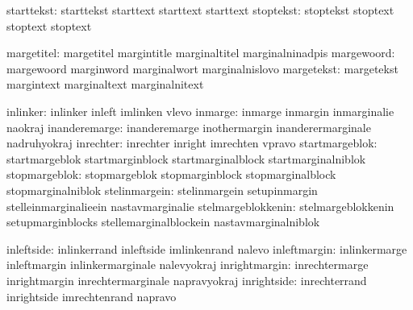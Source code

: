                   starttekst:  starttekst                   starttext
                                starttext                    starttext
                    stoptekst:  stoptekst                    stoptext
                                stoptext                     stoptext

                   margetitel:  margetitel                   margintitle
                                marginaltitel                marginalninadpis
                   margewoord:  margewoord                   marginword
                                marginalwort                 marginalnislovo
                   margetekst:  margetekst                   margintext
                                marginaltext                 marginalnitext

                     inlinker:  inlinker                     inleft
                                imlinken                     vlevo
                      inmarge:  inmarge                      inmargin
                                inmarginalie                 naokraj
                inanderemarge:  inanderemarge                inothermargin
                                inanderermarginale           nadruhyokraj
                    inrechter:  inrechter                    inright
                                imrechten                    vpravo
               startmargeblok:  startmargeblok               startmarginblock
                                startmarginalblock           startmarginalniblok
                stopmargeblok:  stopmargeblok                stopmarginblock
                                stopmarginalblock            stopmarginalniblok
                stelinmargein:  stelinmargein                setupinmargin
                                stelleinmarginalieein        nastavmarginalie
           stelmargeblokkenin:  stelmargeblokkenin           setupmarginblocks
                                stellemarginalblockein       nastavmarginalniblok

                   inleftside:  inlinkerrand                 inleftside
                                imlinkenrand                 nalevo
                 inleftmargin:  inlinkermarge                inleftmargin
                                inlinkermarginale            nalevyokraj
                inrightmargin:  inrechtermarge               inrightmargin
                                inrechtermarginale           napravyokraj
                  inrightside:  inrechterrand                inrightside
                                imrechtenrand                napravo

